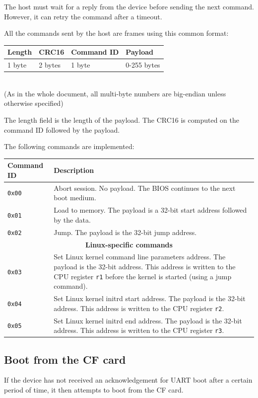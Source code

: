\documentclass[a4paper,11pt]{article}
\begin{document}
The host must wait for a reply from the device before sending the next command. However, it can retry the command after a timeout.

All the commands sent by the host are frames using this common format:\\

\begin{tabular}{|l|l|l|l|}
\hline
\textbf{Length} & \textbf{CRC16} & \textbf{Command ID} & \textbf{Payload} \\
\hline
1 byte & 2 bytes & 1 byte & 0-255 bytes \\
\hline
\end{tabular}\\

(As in the whole document, all multi-byte numbers are big-endian unless otherwise specified)

The length field is the length of the payload. The CRC16 is computed on the command ID followed by the payload.

The following commands are implemented:\\

\begin{tabular}{|l|p{10cm}|}
\hline
\textbf{Command ID} & \textbf{Description} \\
\hline
\verb!0x00! & Abort session. No payload. The BIOS continues to the next boot medium. \\
\hline
\verb!0x01! & Load to memory. The payload is a 32-bit start address followed by the data. \\
\hline
\verb!0x02! & Jump. The payload is the 32-bit jump address. \\
\hline
\multicolumn{2}{|c|}{\textbf{Linux-specific commands}} \\
\hline
\verb!0x03! & Set Linux kernel command line parameters address. The payload is the 32-bit address. This address is written to the CPU register \verb!r1! before the kernel is started (using a jump command). \\
\hline
\verb!0x04! & Set Linux kernel initrd start address. The payload is the 32-bit address. This address is written to the CPU register \verb!r2!. \\
\hline
\verb!0x05! & Set Linux kernel initrd end address. The payload is the 32-bit address. This address is written to the CPU register \verb!r3!. \\
\hline
\end{tabular}

\subsection{Boot from the CF card}
If the device has not received an acknowledgement for UART boot after a certain period of time, it then attempts to boot from the CF card.
\end{document}
